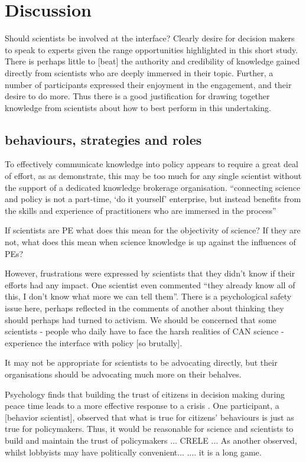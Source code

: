 \chapter{Discussion}\label{ch:discussion}

Should scientists be involved at the interface?
Clearly desire for decision makers to speak to experts given the range opportunities highlighted in this short study. There is perhaps little to [beat] the  authority and credibility of knowledge gained directly from scientists who are deeply immersed in their topic. Further, a number of participants expressed their enjoyment in the engagement, and their desire to do more. Thus there is a good justification for drawing together knowledge from scientists about how to best perform in this undertaking.

\section{behaviours, strategies and roles}
To effectively communicate knowledge into policy appears to require a great deal of effort, as as \textcite{BednarekSHG2015} demonstrate, this may be too much for any single scientist without the support of a dedicated knowledge brokerage organisation. ``connecting science and policy is not a part-time, `do it yourself' enterprise, but instead benefits from the skills and experience of practitioners who are immersed in the process''

If scientists are PE what does this mean for the objectivity of science?
If they are not, what does this mean when science knowledge is up against the influences of PEs?

However, frustrations were expressed by scientists that they didn't know if their efforts had any impact. One scientist even commented ``they already know all of this, I don't know what more we can tell them''. There is a psychological safety issue here, perhaps reflected in the comments of another about thinking they should perhaps had turned to activism. We should be concerned that some scientists - people who daily have to face the harsh realities of CAN science - experience the interface with policy [so brutally].

It may not be appropriate for scientists to be advocating directly, but their organisations should be advocating much more on their behalves.

Psychology finds that building the trust of citizens in decision making during peace time leads to a more effective response to a crisis \cite{BollykyP2024}. One participant, a [behavior scientist], observed that what is true for citizens' behaviours is just as true for policymakers. Thus, it would be reasonable for science and scientists to build and maintain the trust of policymakers ... CRELE ... As another observed, whilst lobbyists may have politically convenient... .... it is a long game.

